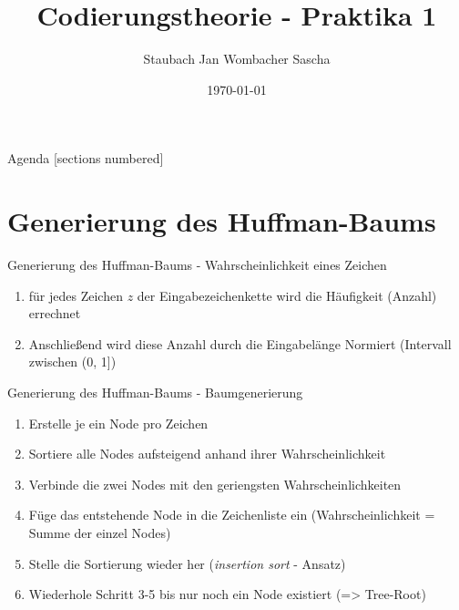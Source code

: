 \documentclass{beamer}
\title{Codierungstheorie - Praktika 1}
\date{\today}
\author{Staubach Jan \newline Wombacher Sascha \newline}
\begin{document}
  \maketitle
  \begin{frame}{Agenda}
    [sections numbered]
    \tableofcontents[hideallsubsections]
  \end{frame}

  \section{Generierung des Huffman-Baums}
  \begin{frame}{Generierung des Huffman-Baums - \newline Wahrscheinlichkeit eines Zeichen}
  	\begin{enumerate}
	  	\item für jedes Zeichen $z$ der Eingabezeichenkette wird die Häufigkeit (Anzahl) errechnet
	  	\item Anschließend wird diese Anzahl durch die Eingabelänge Normiert (Intervall zwischen (0, 1])
	\end{enumerate}
  \end{frame}
  
  \begin{frame}{Generierung des Huffman-Baums - \newline Baumgenerierung}
  	\begin{enumerate}
  		\item Erstelle je ein Node pro Zeichen
  		\item Sortiere alle Nodes aufsteigend anhand ihrer Wahrscheinlichkeit
  		\item Verbinde die zwei Nodes mit den geriengsten Wahrscheinlichkeiten
  		\item Füge das entstehende Node in die Zeichenliste ein \newline (Wahrscheinlichkeit = Summe der einzel Nodes)
  		\item Stelle die Sortierung wieder her \newline (\textit{insertion sort} - Ansatz)
  		\item Wiederhole Schritt 3-5 bis nur noch ein Node existiert \newline (=> Tree-Root)
  	\end{enumerate}
  \end{frame}
  
\end{document}
